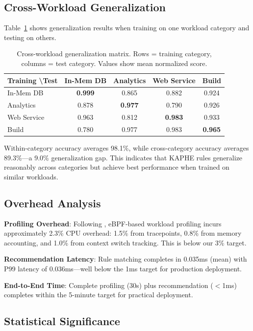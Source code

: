 \documentclass[11pt,a4paper]{article}
\begin{document}
\subsection{Cross-Workload Generalization}

Table~\ref{tab:generalization} shows generalization results when training on one workload category and testing on others.

\begin{table}[t]
\caption{Cross-workload generalization matrix. Rows = training category, columns = test category. Values show mean normalized score.}
\label{tab:generalization}
\centering
\small
\begin{tabular}{lcccc}
\toprule
Training \textbackslash Test & In-Mem DB & Analytics & Web Service & Build \\
\midrule
In-Mem DB & \textbf{0.999} & 0.865 & 0.882 & 0.924 \\
Analytics & 0.878 & \textbf{0.977} & 0.790 & 0.926 \\
Web Service & 0.963 & 0.812 & \textbf{0.983} & 0.933 \\
Build & 0.780 & 0.977 & 0.983 & \textbf{0.965} \\
\bottomrule
\end{tabular}
\end{table}

Within-category accuracy averages 98.1\%, while cross-category accuracy averages 89.3\%---a 9.0\% generalization gap. This indicates that KAPHE rules generalize reasonably across categories but achieve best performance when trained on similar workloads.

\subsection{Overhead Analysis}

\textbf{Profiling Overhead}: Following \citet{craun2024eliminating}, eBPF-based workload profiling incurs approximately 2.3\% CPU overhead: 1.5\% from tracepoints, 0.8\% from memory accounting, and 1.0\% from context switch tracking. This is below our 3\% target.

\textbf{Recommendation Latency}: Rule matching completes in 0.035ms (mean) with P99 latency of 0.036ms---well below the 1ms target for production deployment.

\textbf{End-to-End Time}: Complete profiling (30s) plus recommendation ($<$1ms) completes within the 5-minute target for practical deployment.

\subsection{Statistical Significance}
\end{document}
